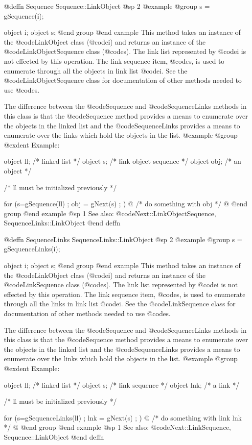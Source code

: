 @deffn {Sequence} Sequence::LinkObject
@sp 2
@example
@group
s = gSequence(i);

object  i;
object  s;
@end group
@end example
This method takes an instance of the @code{LinkObject} class (@code{i})
and returns an instance of the @code{LinkObjectSequence} class
(@code{s}).  The link list represented by @code{i} is not effected by
this operation.  The link sequence item, @code{s}, is used to enumerate
through all the objects in link list @code{i}.  See the
@code{LinkObjectSequence} class for documentation of other methods
needed to use @code{s}.

The difference between the @code{Sequence} and @code{SequenceLinks}
methods in this class is that the @code{Sequence} method provides a
means to enumerate over the objects in the linked list and the
@code{SequenceLinks} provides a means to enumerate over the links
which hold the objects in the list.
@example
@group
@exdent Example:

object  ll;  /*  linked list           */
object  s;   /*  link object sequence  */
object  obj; /*  an object             */

/*  ll must be initialized previously  */

for (s=gSequence(ll) ; obj = gNext(s) ; )  @{
        /*  do something with obj  */
@}
@end group
@end example
@sp 1
See also:  @code{Next::LinkObjectSequence, SequenceLinks::LinkObject}
@end deffn














@deffn {SequenceLinks} SequenceLinks::LinkObject
@sp 2
@example
@group
s = gSequenceLinks(i);

object  i;
object  s;
@end group
@end example
This method takes an instance of the @code{LinkObject} class (@code{i})
and returns an instance of the @code{LinkSequence} class
(@code{s}).  The link list represented by @code{i} is not effected by
this operation.  The link sequence item, @code{s}, is used to enumerate
through all the links in link list @code{i}.  See the
@code{LinkSequence} class for documentation of other methods
needed to use @code{s}.

The difference between the @code{Sequence} and @code{SequenceLinks}
methods in this class is that the @code{Sequence} method provides a
means to enumerate over the objects in the linked list and the
@code{SequenceLinks} provides a means to enumerate over the links
which hold the objects in the list.
@example
@group
@exdent Example:

object  ll;  /*  linked list    */
object  s;   /*  link sequence  */
object  lnk; /*  a link         */

/*  ll must be initialized previously  */

for (s=gSequenceLinks(ll) ; lnk = gNext(s) ; )  @{
        /*  do something with link lnk  */
@}
@end group
@end example
@sp 1
See also:  @code{Next::LinkSequence, Sequence::LinkObject}
@end deffn






